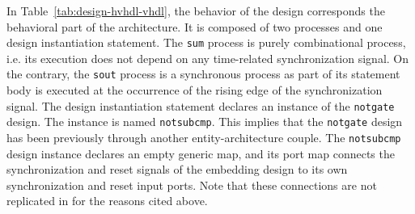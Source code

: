 In Table~\ref{tab:design-hvhdl-vhdl}, the behavior of the design
corresponds the behavioral part of the architecture. It is composed of
two processes and one design instantiation statement. The \texttt{sum}
process is purely combinational process, i.e. its execution does not
depend on any time-related synchronization signal. On the contrary,
the \texttt{sout} process is a synchronous process as part of its
statement body is executed at the occurrence of the rising edge of the
synchronization signal. The design instantiation statement declares an
instance of the \texttt{notgate} design. The instance is named
\texttt{notsubcmp}. This implies that the \texttt{notgate} design has
been previously through another entity-architecture couple. The
\texttt{notsubcmp} design instance declares an empty generic map, and
its port map connects the synchronization and reset signals of the
embedding design to its own synchronization and reset input
ports. Note that these connections are not replicated in \hvhdl{} for
the reasons cited above.

